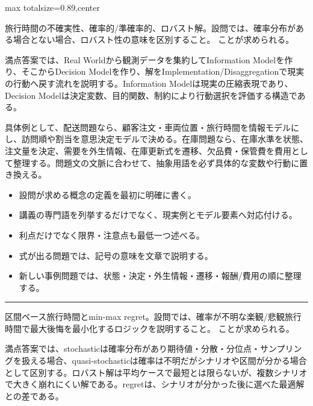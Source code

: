 \begin{minipage}[t]{0.58\textwidth}
\begin{adjustbox}{max totalsize={\textwidth}{0.89\textheight},center}
\begin{minipage}{\textwidth}
\end{minipage}
\end{adjustbox}
\end{minipage}

\clearpage{}
旅行時間の不確実性、確率的/準確率的、ロバスト解。設問では、確率分布がある場合とない場合、ロバスト性の意味を区別すること。 ことが求められる。\par
{}
満点答案では、Real Worldから観測データを集約してInformation Modelを作り、そこからDecision Modelを作り、解をImplementation/Disaggregationで現実の行動へ戻す流れを説明する。Information Modelは現実の圧縮表現であり、Decision Modelは決定変数、目的関数、制約により行動選択を評価する構造である。\par
{}
具体例として、配送問題なら、顧客注文・車両位置・旅行時間を情報モデルにし、訪問順や割当を意思決定モデルで決める。在庫問題なら、在庫水準を状態、注文量を決定、需要を外生情報、在庫更新式を遷移、欠品費・保管費を費用として整理する。問題文の文脈に合わせて、抽象用語を必ず具体的な変数や行動に置き換える。\par
{}
\begin{itemize}
\item 設問が求める概念の定義を最初に明確に書く。
\item 講義の専門語を列挙するだけでなく、現実例とモデル要素へ対応付ける。
\item 利点だけでなく限界・注意点も最低一つ述べる。
\item 式が出る問題では、記号の意味を文章で説明する。
\item 新しい事例問題では、状態・決定・外生情報・遷移・報酬/費用の順に整理する。
\end{itemize}
\vspace{2mm}\hrule\vspace{2mm}
区間ベース旅行時間とmin-max regret。設問では、確率が不明な楽観/悲観旅行時間で最大後悔を最小化するロジックを説明すること。 ことが求められる。\par
{}
満点答案では、stochasticは確率分布があり期待値・分散・分位点・サンプリングを扱える場合、quasi-stochasticは確率は不明だがシナリオや区間が分かる場合として区別する。ロバスト解は平均ケースで最短とは限らないが、複数シナリオで大きく崩れにくい解である。regretは、シナリオが分かった後に選べた最適解との差である。\par
